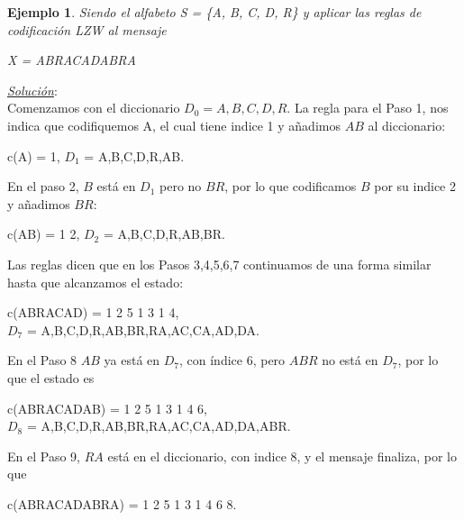 \documentclass{beamer}
\theoremstyle{plain}
\theoremstyle{example}
\theoremstyle{example}
\newtheorem{ejemplo} [Ejemplo] {Ejemplo}
\begin{document}
\begin{frame}  \small 

\begin{ejemplo}

Siendo el alfabeto S = \{A, B, C, D, R\} y aplicar las reglas de codificación LZW al mensaje

\begin{center}
X = ABRACADABRA
\end{center}	

\end{ejemplo}
\pause
\textit{\underline{Solución}}:\\

Comenzamos con el diccionario $D_0 = A, B, C, D, R$. La regla para el Paso 1, nos indica que codifiquemos A, el cual tiene indice 1 y añadimos $AB$ al diccionario:

\begin{center}
c(A) = 1,	$D_1$ = A,B,C,D,R,AB.
\end{center}

En el paso 2, $B$ está en $D_1$ pero no $BR$, por lo que codificamos $B$ por su indice 2 y añadimos $BR$:

\begin{center}
c(AB) = 1 2,	$D_2$ = A,B,C,D,R,AB,BR.
\end{center}


\end{frame} 

\begin{frame}  \small 

Las reglas dicen que en los Pasos 3,4,5,6,7 continuamos de una forma similar hasta que alcanzamos el estado:

\begin{center}
c(ABRACAD) = 1 2 5 1 3 1 4,\\	$D_7$ = A,B,C,D,R,AB,BR,RA,AC,CA,AD,DA.
\end{center}

En el Paso 8 $AB$ ya está en $D_7$, con índice 6, pero $ABR$ no está en $D_7$, por lo que el estado es 

\begin{center}
c(ABRACADAB) = 1 2 5 1 3 1 4 6, \\
$D_8$ = A,B,C,D,R,AB,BR,RA,AC,CA,AD,DA,ABR.
\end{center}

En el Paso 9, $RA$ está en el diccionario, con indice 8, y el mensaje finaliza, por lo que 

\begin{center}
c(ABRACADABRA) = 1 2 5 1 3 1 4 6 8.
\end{center}


\end{frame} 
\end{document}
